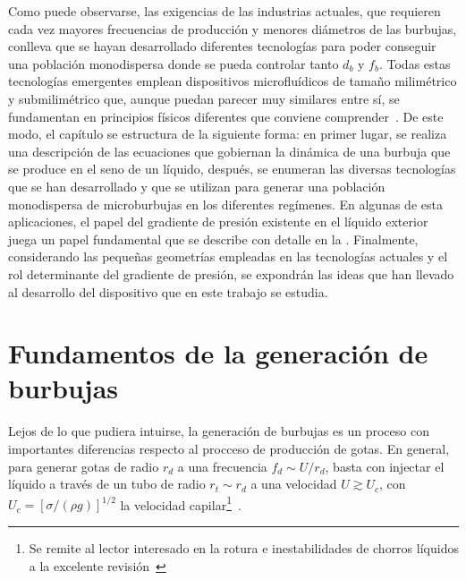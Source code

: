 Como puede observarse, las exigencias de las industrias actuales, que requieren cada vez mayores frecuencias de producción y menores diámetros de las burbujas, conlleva que se hayan desarrollado diferentes tecnologías para poder conseguir una población monodispersa donde se pueda controlar tanto $d_{b}$ y $f_{b}$. Todas estas tecnologías emergentes emplean dispositivos microfluídicos de tamaño milimétrico y submilimétrico que, aunque puedan parecer muy similares entre sí, se fundamentan en principios físicos diferentes que conviene comprender~\cite{Rodriguez-Rodriguez2015b}. De este modo, el capítulo se estructura de la siguiente forma: en primer lugar, se realiza una descripción de las ecuaciones que gobiernan la dinámica de una burbuja que se produce en el seno de un líquido, después, se enumeran las diversas tecnologías que se han desarrollado y que se utilizan para generar una población monodispersa de microburbujas en los diferentes regímenes. En algunas de esta aplicaciones, el papel del gradiente de presión existente en el líquido exterior juega un papel fundamental que se describe con detalle en la . Finalmente, considerando las pequeñas geometrías empleadas en las tecnologías actuales y el rol determinante del gradiente de presión, se expondrán las ideas que han llevado al desarrollo del dispositivo que en este trabajo se estudia. 

\section{Fundamentos de la generación de burbujas}

Lejos de lo que pudiera intuirse, la generación de burbujas es un proceso con importantes diferencias respecto al procceso de producción de gotas. En general, para generar gotas de radio $r_{d}$ a una frecuencia $f_{d}\sim U/r_{d}$, basta con injectar el líquido a través de un tubo de radio $r_{t}\sim r_{d}$ a una velocidad $U \gtrsim U_{c}$, con $U_{c} = \left[\sigma/\left(\rho g\right)\right]^{1/2}$ la velocidad capilar\footnote{Se remite al lector interesado en la rotura e inestabilidades de chorros líquidos a la excelente revisión~\cite{Eggers2008}}~\cite{Rodriguez-Rodriguez2015b}. 


